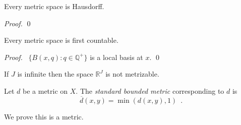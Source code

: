 \begin{lm}
  \label{lm:topology:metric:Hausdorff}
  Every metric space is Hausdorff.
\end{lm}

\begin{proof}
  \pf
  \qed
\end{proof}

\begin{thm}
  Every metric space is first countable.
\end{thm}

\begin{proof}
  \pf\ $\{ B(x, q) : q \in \mathbb{Q}^+ \}$ is a local basis at $x$. \qed
\end{proof}

\begin{cor}
  If $J$ is infinite then the space $\mathbb{R}^J$ is not metrizable.
\end{cor}

\begin{df}
  Let $d$ be a metric on $X$. The \emph{standard bounded metric}
  corresponding to $d$ is
  \[ \overline{d}(x, y) = \min(d(x, y), 1) \enspace . \]

  We prove this is a metric.
\end{df}

